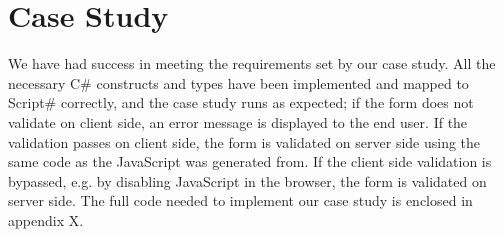 \section{Case Study} %
\label{sec:reflection_on_case_study}

	We have had success in meeting the requirements set by our case study. All the necessary C\# constructs and types have been implemented and mapped to Script\# correctly, and the case study runs as expected; if the form does not validate on client side, an error message is displayed to the end user. If the validation passes on client side, the form is validated on server side using the same code as the JavaScript was generated from. If the client side validation is bypassed, e.g. by disabling JavaScript in the browser, the form is validated on server side. The full code needed to implement our case study is enclosed in appendix X.







